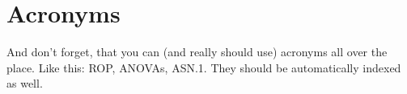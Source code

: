 \chapter{Acronyms}
And don't forget, that you can (and really should use) acronyms all over the place. Like this: \gls{ROP}, \glspl{ANOVA}, \acrshort{ASN.1}. They should be automatically indexed as well.
